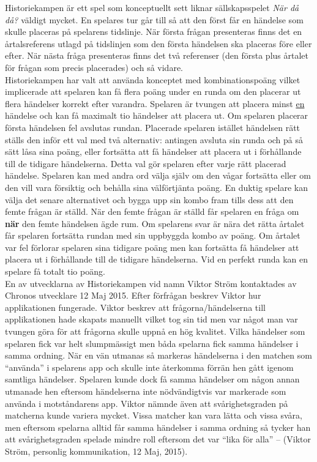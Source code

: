 \documentclass[a4paper, 11pt]{article}
\begin{document}
Historiekampen är ett spel som konceptuellt sett liknar sällskapsspelet \textit{När då då?} väldigt mycket. En spelares tur går till så att den först får en händelse som skulle placeras på spelarens tidslinje. När första frågan presenteras finns det en årtalsreferens utlagd på tidslinjen som den första händelsen ska placeras före eller efter. När nästa fråga presenteras finns det två referenser (den första plus årtalet för frågan som precis placerades) och så vidare.\\ 
Historiekampen har valt att använda konceptet med kombinationspoäng vilket implicerade att spelaren kan få flera poäng under en runda om den placerar ut flera händelser korrekt efter varandra. Spelaren är tvungen att placera minst \underline{en} händelse och kan få maximalt tio händelser att placera ut. Om spelaren placerar första händelsen fel avslutas rundan. Placerade spelaren istället händelsen rätt ställs den inför ett val med två alternativ: antingen avsluta sin runda och på så sätt låsa sina poäng, eller fortsätta att få händelser att placera ut i förhållande till de tidigare händelserna. Detta val gör spelaren efter varje rätt placerad händelse. Spelaren kan med andra ord välja själv om den vågar fortsätta eller om den vill vara försiktig och behålla sina välförtjänta poäng. En duktig spelare kan välja det senare alternativet och bygga upp sin kombo fram tills dess att den femte frågan är ställd. När den femte frågan är ställd får spelaren en fråga om \textbf{när} den femte händelsen ägde rum. Om spelarens svar är nära det rätta årtalet får spelaren fortsätta rundan med sin uppbyggda kombo av poäng. Om årtalet var fel förlorar spelaren sina tidigare poäng men kan fortsätta få händelser att placera ut i förhållande till de tidigare händelserna. Vid en perfekt runda kan en spelare få totalt tio poäng.\\
En av utvecklarna av Historiekampen vid namn Viktor Ström kontaktades av Chronos utvecklare 12 Maj 2015. Efter förfrågan beskrev Viktor hur applikationen fungerade. Viktor beskrev att frågorna/händelserna till applikationen hade skapats manuellt vilket tog sin tid men var något man var tvungen göra för att frågorna skulle uppnå en hög kvalitet. Vilka händelser som spelaren fick var helt slumpmässigt men båda spelarna fick samma händelser i samma ordning. När en vän utmanas så markeras händelserna i den matchen som ``använda'' i spelarens app och skulle inte återkomma förrän hen gått igenom samtliga händelser. Spelaren kunde dock få samma händelser om någon annan utmanade hen eftersom händelserna inte nödvändigtvis var markerade som använda i motståndarens app. 
Viktor nämnde även att svårighetsgraden på matcherna kunde variera mycket. Vissa matcher kan vara lätta och vissa svåra, men eftersom spelarna alltid får samma händelser i samma ordning så tycker han att svårighetsgraden spelade mindre roll eftersom det var ``lika för alla'' -- (Viktor Ström, personlig kommunikation, 12 Maj, 2015). 
\end{document}
